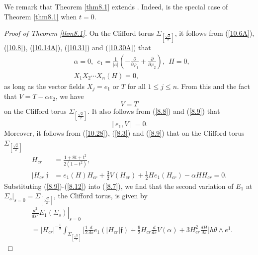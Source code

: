 \documentclass{amsart}
\theoremstyle{Corollary}
\numberwithin{equation}{section}
\begin{document}
We remark that Theorem \ref{thm8.1} extends 
\cite[Theorem 1.3]{CCYZ}. Indeed, 
\cite[Theorem 1.3]{CCYZ} is the special case of Theorem \ref{thm8.1}
when $t=0$. 
 
\begin{proof}[Proof of Theorem \ref{thm8.1}]
On the Clifford torus $\Sigma_{[\frac{\sqrt{2}}{2}]}$, it follows from  (\ref{10.6A}), (\ref{10.8}), (\ref{10.14A}), (\ref{10.31})
and (\ref{10.30A}) that 
\begin{equation}\label{8.9}
\begin{split}
&\alpha=0,~~e_1=\frac{1}{|a|}\left(-\frac{\partial}{\partial\varphi_1}+\frac{\partial}{\partial\varphi_2}\right),
~~H=0,\\
&X_1X_2\cdots X_n(H)=0,
\end{split}
\end{equation}
as long as the vector fields $X_j=e_1$ or $T$ for all $1\leq j\leq n$. 
From this and the fact that $V=T-\alpha e_2$, we have 
\begin{equation}\label{8.10}
V=T
\end{equation}
 on the Clifford torus $\Sigma_{[\frac{\sqrt{2}}{2}]}$. 
It also follows from (\ref{8.8}) and (\ref{8.9}) that
\begin{equation}\label{8.11}
[e_1,V]=0. 
\end{equation}
Moreover, it follows from (\ref{10.28}), (\ref{8.3}) and (\ref{8.9}) that 
on the Clifford torus $\Sigma_{[\frac{\sqrt{2}}{2}]}$
\begin{equation}\label{8.12}
\begin{split}
H_{cr}&=\frac{1+8t+t^2}{2(1-t^2)},\\
|H_{cr}|\mathfrak{f}&=e_1(H) H_{cr}+\frac{3}{2}V(H_{cr})+\frac{1}{2}H e_1(H_{cr})
-\alpha H H_{cr}=0.
\end{split}
\end{equation}
Substituting (\ref{8.9})-(\ref{8.12}) into 
(\ref{8.7}), we find that the second variation of $E_1$ at $\Sigma_s\big|_{s=0}=\Sigma_{[\frac{\sqrt{2}}{2}]}$, 
the Clifford torus, is given by 
\begin{equation}\label{8.13}
\begin{split}
&\left.\frac{d^2}{ds^2}E_1(\Sigma_s)\right|_{s=0}\\ &=
|H_{cr}|^{-\frac{1}{2}}\int_{\Sigma_{[\frac{\sqrt{2}}{2}]}}
\Bigg[\frac{1}{2}\frac{d}{ds}e_1(|H_{cr}|\mathfrak{f})
+\frac{9}{2}H_{cr}\frac{d}{ds}V(\alpha)+3H_{cr}^2\frac{dH}{ds}\Bigg]h\theta\wedge e^1.
\end{split}
\end{equation}

\end{proof}
\end{document}

